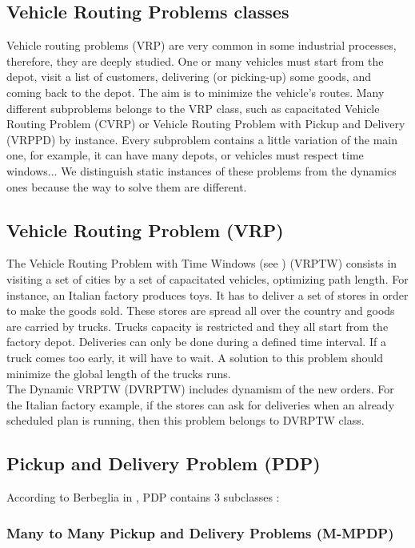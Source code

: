 \documentclass[a4paper,10pt]{article}
\begin{document}
\begin{multicols}{2}
\section{Vehicle Routing Problems classes}
 
Vehicle routing problems (VRP) are very common in some industrial processes, therefore, they are deeply studied. One or many vehicles must start from the depot, visit a list of customers, delivering (or picking-up) some goods, and coming back to the depot. The aim is to minimize the vehicle's routes. Many different subproblems belongs to the VRP class, such as capacitated Vehicle Routing Problem (CVRP) or Vehicle Routing Problem with Pickup and Delivery (VRPPD) by instance. Every subproblem contains a little variation of the main one, for example, it can have many depots, or vehicles must respect time windows... We distinguish static instances of these problems from the dynamics ones because the way to solve them are different.

\subsection{Vehicle Routing Problem (VRP)}
The Vehicle Routing Problem with Time Windows (see \cite{Bianchi00}) (VRPTW) consists in visiting a set of cities by a set of capacitated vehicles, optimizing path length. For instance, an Italian factory produces toys. It has to deliver a set of stores in order to make the goods sold. These stores are spread all over the country and goods are carried by trucks. Trucks capacity is restricted and they all start from the factory depot. Deliveries can only be done during a defined time interval. If a truck comes too early, it will have to wait. A solution to this problem should minimize the global length of the trucks runs.\\

The Dynamic VRPTW (DVRPTW) includes dynamism of the new orders. For the Italian factory example, if the stores can ask for deliveries when an already scheduled plan is running, then this problem belongs to DVRPTW class.

\subsection{Pickup and Delivery Problem (PDP)}
According to Berbeglia in \cite{Berbeglia07}, PDP contains 3 subclasses :\\

\subsubsection{Many to Many Pickup and Delivery Problems (M-MPDP) }


\end{multicols}
\end{document}
